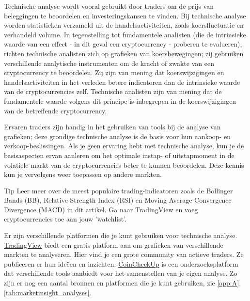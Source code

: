 Technische analyse wordt vooral gebruikt door traders om de prijs van beleggingen te beoordelen en investeringskansen te vinden. Bij technische analyse worden statistieken verzameld uit de handelsactiviteiten, zoals koersfluctuatie en verhandeld volume. In tegenstelling tot fundamentele analisten (die de intrinsieke waarde van een effect - in dit geval een cryptocurrency - proberen te evalueren), richten technische analisten zich op grafieken van koersbewegingen; zij gebruiken verschillende analytische instrumenten om de kracht of zwakte van een cryptocurrency te beoordelen. Zij zijn van mening dat koerswijzigingen en handelsactiviteiten in het verleden betere indicatoren dan de intrinsieke waarde van de cryptocurrencies zelf. Technische analisten zijn van mening dat de fundamentele waarde volgens dit principe is inbegrepen in de koerswijzigingen van de betreffende cryptocurrency.\medskip

Ervaren traders zijn handig in het gebruiken van tools bij de analyse van grafieken; deze grondige technische analyse is de basis voor hun aankoop- en verkoop-beslissingen. Als je geen ervaring hebt met technische analyse, kun je de basisaspecten ervan aanleren om het optimale instap- of uitstapmoment in de volatiele markt van de cryptocurrencies beter te kunnen beoordelen. Deze kennis kun je vervolgens weer toepassen op andere  markten.

    \medskip
    \begin{tipbox}{Tip}
    Leer meer over de meest populaire trading-indicatoren zoals de Bollinger Bands (BB), Relative Strength Index (RSI) en Moving Average Convergence Divergence (MACD) in \href{https://medium.com/@harrynicholls/7-popular-technical-indicators-and-how-to-use-them-to-increase-your-trading-profits-7f13ffeb8d05}{dit artikel}.  
    \tcblower
    Ga naar \href{https://www.tradingview.com/}{TradingView} en voeg cryptocurrencies toe aan jouw 'watchlist'.
    \end{tipbox}
    \medskip    

Er zijn verschillende platformen die je kunt gebruiken voor technische analyse. \href{https://www.tradingview.com/}{TradingView} biedt een gratis platform aan om grafieken van verschillende markten te analyseren. Hier vind je een grote community van actieve traders. Ze publiceren er hun ide{\"e}en en inzichten. \href{https://coincheckup.com/}{CoinCheckUp} is een onderzoeksplatform dat verschillende tools aanbiedt voor het samenstellen van je eigen analyse. Zo zijn er nog een aantal bronnen en platformen die je kunt gebruiken, zie \cref{app:A}, \cref{tab:marketinsight_analyses}. 


